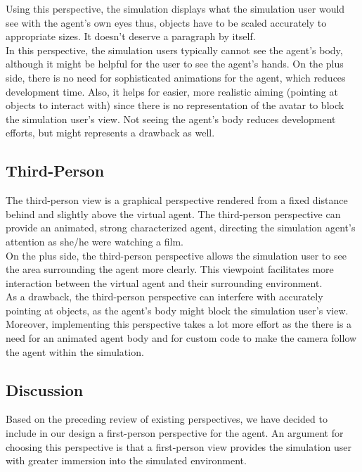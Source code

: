 Using this perspective, the simulation displays what the simulation user would see with the agent's own eyes thus, objects have to be scaled accurately to appropriate sizes. It doesn't deserve a paragraph by itself.\\

In this perspective, the simulation users typically cannot see the agent's body, although it might be helpful for the user to see the agent's hands. On the plus side, there is no need for sophisticated animations for the agent, which reduces development time. Also, it helps for easier, more realistic aiming (pointing at objects to interact with) since there is no representation of the avatar to block the simulation user's view. Not seeing the agent's body reduces development efforts, but might represents a drawback as well.\\

\subsection{Third-Person}\label{subsec:third_person}
The third-person view is a graphical perspective rendered from a fixed distance behind and slightly above the virtual agent. The third-person perspective can provide an animated, strong characterized agent, directing the simulation agent's attention as she/he were watching a film.\\

On the plus side, the third-person perspective allows the simulation user to see the area surrounding the agent more clearly. This viewpoint facilitates more interaction between the virtual agent and their surrounding environment.\\

As a drawback, the third-person perspective can interfere with accurately pointing at objects, as the agent's body might block the simulation user's view. Moreover, implementing this perspective takes a lot more effort as the there is a need for an animated agent body and for custom code to make the camera follow the agent within the simulation.\\

\subsection{Discussion}\label{subsec:agent_discussion}
Based on the preceding review of existing perspectives, we have decided to include in our design a first-person perspective for the agent. An argument for choosing this perspective is that a first-person view provides the simulation user with greater immersion into the simulated environment.\\

